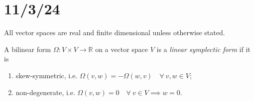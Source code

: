 \documentclass[12pt]{book}
\begin{document}
\todototoc
\listoftodos[]


\section*{11/3/24}\label{Sec: 11/3/24}
\begin{Nt}\label{Nt: Vector spaces}
    All vector spaces are real and finite dimensional unless otherwise stated.
\end{Nt}

\begin{Dfn}\label{Dfn: Linear symplectic form}
    A bilinear form $\Omega:V\times V\to \mathbb{R}$ on a vector space $V$ is a \emph{linear symplectic form} if it is
    \begin{enumerate}[label=\DfnLbl]
    
        \item skew-symmetric, i.e. $\Omega(v,w) = -\Omega(w,v) \quad \forall \ v,w\in V$;

        \item non-degenerate, i.e. $\Omega(v,w) = 0 \quad \forall \ v\in V \implies w=0$.
    \end{enumerate}
\end{Dfn}
\end{document}
